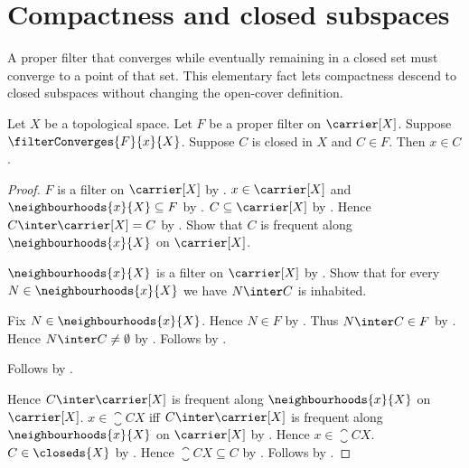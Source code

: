 \section{Compactness and closed subspaces}





A proper filter that converges while eventually remaining in a closed set
must converge to a point of that set.  This elementary fact lets compactness
descend to closed subspaces without changing the open-cover definition.

\begin{proposition}\label{filter_limit_belongs_to_closed_eventual_set}
    Let $X$ be a topological space.
    Let $F$ be a proper filter on $\carrier[X]$.
    Suppose $\filterConverges{F}{x}{X}$.
    Suppose $C$ is closed in $X$ and $C\in F$.
    Then $x\in C$.
\end{proposition}
\begin{proof}
    $F$ is a filter on $\carrier[X]$ by
        .
    $x\in\carrier[X]$ and $\neighbourhoods{x}{X}\subseteq F$ by
        .
    $C\subseteq\carrier[X]$ by .
    Hence $C\inter\carrier[X]=C$ by
        .
    Show that $C$ is frequent along $\neighbourhoods{x}{X}$ on
        $\carrier[X]$.
    \begin{subproof}
        $\neighbourhoods{x}{X}$ is a filter on $\carrier[X]$ by
            .
        Show that for every $N\in\neighbourhoods{x}{X}$ we have
            $N\inter C$ is inhabited.
        \begin{subproof}
            Fix $N\in\neighbourhoods{x}{X}$.
            Hence $N\in F$ by .
            Thus $N\inter C\in F$ by .
            Hence $N\inter C\neq\emptyset$ by
                .
            Follows by .
        \end{subproof}
        Follows by
            .
    \end{subproof}
    Hence $C\inter\carrier[X]$ is frequent along
        $\neighbourhoods{x}{X}$ on $\carrier[X]$.
    $x\in\closure{C}{X}$ iff $C\inter\carrier[X]$ is frequent along
        $\neighbourhoods{x}{X}$ on $\carrier[X]$ by
        .
    Hence $x\in\closure{C}{X}$.
    $C\in\closeds{X}$ by .
    Hence $\closure{C}{X}\subseteq C$ by
        .
    Follows by .
\end{proof}

